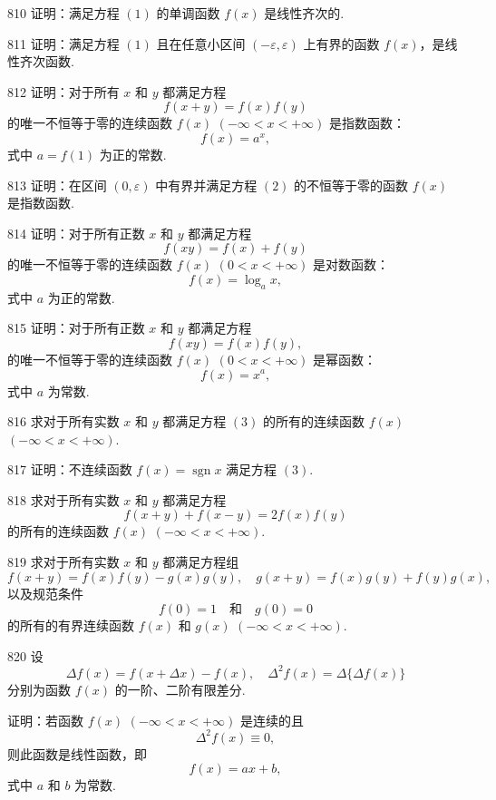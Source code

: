 \begin{prob}[M]{810}
证明：满足方程 $(1)$ 的单调函数 $f(x)$ 是线性齐次的.
\end{prob}

\begin{prob}[M]{811}
证明：满足方程 $(1)$ 且在任意小区间 $(-\varepsilon, \varepsilon)$ 上有界的函数 $f(x)$，是线性齐次函数.
\end{prob}

\begin{prob}[M]{812}
证明：对于所有 $x$ 和 $y$ 都满足方程
\[
f(x + y) = f(x) f(y) \tag{2}
\]
的唯一不恒等于零的连续函数 $f(x)$ $(-\infty < x < +\infty)$ 是指数函数：
\[
f(x) = a^x,
\]
式中 $a = f(1)$ 为正的常数.
\end{prob}

\begin{prob}[M]{813}
证明：在区间 $(0, \varepsilon)$ 中有界并满足方程 $(2)$ 的不恒等于零的函数 $f(x)$ 是指数函数.
\end{prob}

\begin{prob}[M]{814}
证明：对于所有正数 $x$ 和 $y$ 都满足方程
\[
f(xy) = f(x) + f(y)
\]
的唯一不恒等于零的连续函数 $f(x)$ $(0 < x < +\infty)$ 是对数函数：
\[
f(x) = \log_a x,
\]
式中 $a$ 为正的常数.
\end{prob}

\begin{prob}[M]{815}
证明：对于所有正数 $x$ 和 $y$ 都满足方程
\[
f(xy) = f(x) f(y), \tag{3}
\]
的唯一不恒等于零的连续函数 $f(x)$ $(0 < x < +\infty)$ 是幂函数：
\[
f(x) = x^a,
\]
式中 $a$ 为常数.
\end{prob}

\begin{prob}[M]{816}
求对于所有实数 $x$ 和 $y$ 都满足方程 $(3)$ 的所有的连续函数 $f(x)$ $(-\infty < x < +\infty)$.
\end{prob}

\begin{prob}[S]{817}
证明：不连续函数 $f(x) = \operatorname{sgn} x$ 满足方程 $(3)$.
\end{prob}

\begin{prob}[M]{818}
求对于所有实数 $x$ 和 $y$ 都满足方程
\[
f(x + y) + f(x - y) = 2f(x) f(y)
\]
的所有的连续函数 $f(x)$ $(-\infty < x < +\infty)$.
\end{prob}

\begin{prob}[M]{819}
求对于所有实数 $x$ 和 $y$ 都满足方程组
\[
f(x + y) = f(x) f(y) - g(x) g(y), \quad g(x + y) = f(x) g(y) + f(y) g(x),
\]
以及规范条件
\[
f(0) = 1 \quad \text{和} \quad g(0) = 0
\]
的所有的有界连续函数 $f(x)$ 和 $g(x)$ $(-\infty < x < +\infty)$.
\end{prob}

\begin{prob}[M]{820}
设
\[
\Delta f(x) = f(x + \Delta x) - f(x), \quad \Delta^2 f(x) = \Delta\{\Delta f(x)\}
\]
分别为函数 $f(x)$ 的一阶、二阶有限差分.

证明：若函数 $f(x)$ $(-\infty < x < +\infty)$ 是连续的且
\[
\Delta^2 f(x) \equiv 0,
\]
则此函数是线性函数，即
\[
f(x) = ax + b,
\]
式中 $a$ 和 $b$ 为常数.
\end{prob}
